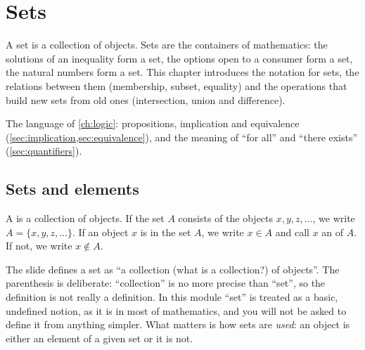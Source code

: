 \chapter{Sets}\label{ch:sets}

\begin{chapterintro}
A set is a collection of objects. Sets are the containers of mathematics: the solutions of an inequality
form a set, the options open to a consumer form a set, the natural numbers form a set. This chapter
introduces the notation for sets, the relations between them (membership, subset, equality) and the
operations that build new sets from old ones (intersection, union and difference).
\end{chapterintro}

\begin{prerequisites}
The language of \cref{ch:logic}: propositions, implication and equivalence (\cref{sec:implication,sec:equivalence}),
and the meaning of ``for all'' and ``there exists'' (\cref{sec:quantifiers}).
\end{prerequisites}

\section{Sets and elements}\label{sec:sets-basic}

\begin{definition}
A  is a collection of objects. If the set $A$ consists of the objects $x,y,z,\dots$, we write
$A=\{x,y,z,\dots\}$. If an object $x$ is in the set $A$, we write $x\in A$ and call $x$ an
 of $A$. If not, we write $x\notin A$. 
\end{definition}

\begin{sourcenote}
The slide defines a set as ``a collection (what is a collection?) of objects''. The parenthesis is
deliberate: ``collection'' is no more precise than ``set'', so the definition is not really a definition.
In this module ``set'' is treated as a basic, undefined notion, as it is in most of mathematics, and you
will not be asked to define it from anything simpler. What matters is how sets are \emph{used}: an object
is either an element of a given set or it is not.
\end{sourcenote}

